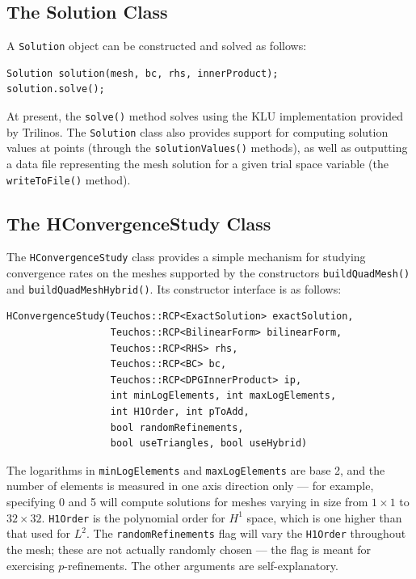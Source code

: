 \subsection{The Solution Class}\label{NVR:sec:Solution} A \verb=Solution= object can be constructed and solved as follows:
\begin{lstlisting}
Solution solution(mesh, bc, rhs, innerProduct);
solution.solve();
\end{lstlisting}

At present, the \verb=solve()= method solves using the KLU implementation provided by Trilinos.  The \verb=Solution= class also provides support for computing solution values at points (through the \verb=solutionValues()= methods), as well as outputting a data file representing the mesh solution for a given trial space variable (the \verb=writeToFile()= method).

\subsection{The HConvergenceStudy Class}\label{NVR:sec:HConvergenceStudy}  The \verb=HConvergenceStudy= class provides a simple mechanism for studying convergence rates on the meshes supported by the constructors \verb=buildQuadMesh()= and \verb=buildQuadMeshHybrid()=.  Its constructor interface is as follows:
\begin{lstlisting}
HConvergenceStudy(Teuchos::RCP<ExactSolution> exactSolution,
                  Teuchos::RCP<BilinearForm> bilinearForm,
                  Teuchos::RCP<RHS> rhs,
                  Teuchos::RCP<BC> bc,
                  Teuchos::RCP<DPGInnerProduct> ip, 
                  int minLogElements, int maxLogElements, 
                  int H1Order, int pToAdd, 
                  bool randomRefinements,
                  bool useTriangles, bool useHybrid)
\end{lstlisting}

The logarithms in \verb=minLogElements= and \verb=maxLogElements= are base 2, and the number of elements is measured in one axis direction only --- for example, specifying 0 and 5 will compute solutions for meshes varying in size from $1 \times 1$ to $32 \times 32$.  \verb=H1Order= is the polynomial order for $H^{1}$ space, which is one higher than that used for $L^{2}$.  The \verb=randomRefinements= flag will vary the \verb=H1Order= throughout the mesh; these are not actually randomly chosen --- the flag is meant for exercising $p$-refinements.  The other arguments are self-explanatory.

